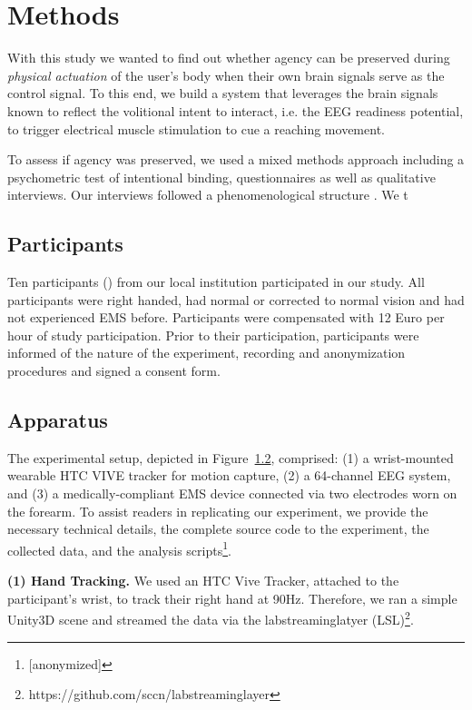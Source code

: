 
\section{Methods}

With this study we wanted to find out whether agency can be preserved during \textit{physical actuation} of the user's body when their own brain signals serve as the control signal. To this end, we build a system that leverages the brain signals known to reflect the volitional intent to interact, i.e. the EEG readiness potential, to trigger electrical muscle stimulation to cue a reaching movement.

To assess if agency was preserved, we used a mixed methods approach including a psychometric test of intentional binding, questionnaires as well as qualitative interviews. Our interviews followed a phenomenological structure . We t

\subsection{Participants}

 Ten participants () from our local institution participated in our study. All participants were right handed, had normal or corrected to normal vision and had not experienced EMS before. Participants were compensated with 12 Euro per hour of study participation. Prior to their participation, participants were informed of the nature of the experiment, recording and anonymization procedures and signed a consent form.

\subsection{Apparatus}
The experimental setup, depicted in Figure~\ref{}, comprised: (1) a wrist-mounted wearable HTC VIVE tracker for motion capture, (2) a 64-channel EEG system, and (3) a medically-compliant EMS device connected via two electrodes worn on the forearm. To assist readers in replicating our experiment, we provide the necessary technical details, the complete source code to the experiment, the collected data, and the analysis scripts\footnote{[anonymized]}.

\indent\textbf{(1) Hand Tracking.} We used an HTC Vive Tracker, attached to the participant's wrist, to track their right hand at 90Hz. Therefore, we ran a simple Unity3D scene and streamed the data via the labstreaminglatyer (LSL)\footnote{https://github.com/sccn/labstreaminglayer}.

